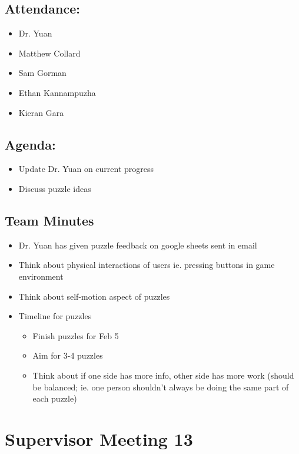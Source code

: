\documentclass{article}
\begin{document}
\subsection*{Attendance:}
\begin{itemize}
    \item Dr. Yuan
    \item Matthew Collard
    \item Sam Gorman
    \item Ethan Kannampuzha
    \item Kieran Gara
\end{itemize}

\subsection*{Agenda:}
\begin{itemize}
    \item Update Dr. Yuan on current progress
    \item Discuss puzzle ideas
\end{itemize}

\subsection*{Team Minutes}

\begin{itemize}
    \item Dr. Yuan has given puzzle feedback on google sheets sent in email
    \item Think about physical interactions of users ie. pressing buttons in game environment
    \item Think about self-motion aspect of puzzles
    \item Timeline for puzzles 
    \begin{itemize}
        \item Finish puzzles for Feb 5
        \item Aim for 3-4 puzzles
        \item Think about if one side has more info, other side has more work (should be balanced; ie. one person shouldn't always be doing the same part of each puzzle)
    \end{itemize}
\end{itemize}

\pagebreak

\section*{Supervisor Meeting 13}
\end{document}
